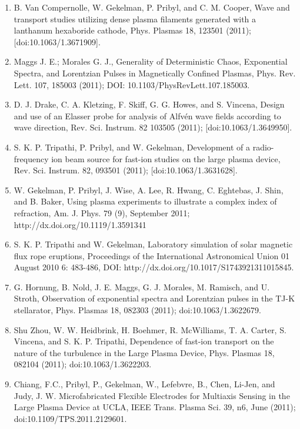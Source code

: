 \documentclass[11pt]{article}
\begin{document}
\begin{enumerate}
\item   B. Van Compernolle, W. Gekelman, P. Pribyl, and C. M. Cooper, Wave and transport studies utilizing dense plasma filaments generated with a lanthanum hexaboride cathode, Phys. Plasmas 18, 123501 (2011); [doi:10.1063/1.3671909].

\item  Maggs J. E.; Morales G. J., Generality of Deterministic Chaos, Exponential Spectra, and Lorentzian Pulses in Magnetically Confined Plasmas, Phys. Rev. Lett. 107, 185003 (2011); DOI: 10.1103/PhysRevLett.107.185003.

\item  D. J. Drake, C. A. Kletzing, F. Skiff, G. G. Howes, and S. Vincena, Design and use of an Elasser probe for analysis of Alfv\'{e}n wave fields according to wave direction, Rev. Sci. Instrum. 82 103505 (2011); [doi:10.1063/1.3649950].

\item   S. K. P. Tripathi, P. Pribyl, and W. Gekelman, Development of a radio-frequency ion beam source for fast-ion studies on the large plasma device, Rev. Sci. Instrum. 82, 093501 (2011); [doi:10.1063/1.3631628].

\item   W. Gekelman, P. Pribyl, J. Wise, A. Lee, R. Hwang, C. Eghtebas, J. Shin, and B. Baker, Using plasma experiments to illustrate a complex index of refraction, Am. J. Phys. 79 (9), September 2011; http://dx.doi.org/10.1119/1.3591341

\item   S. K. P. Tripathi and W. Gekelman, Laboratory simulation of solar magnetic flux rope eruptions, Proceedings of the International Astronomical Union 01 August 2010 6: 483-486, DOI: http://dx.doi.org/10.1017/S1743921311015845.

\item   G. Hornung, B. Nold, J. E. Maggs, G. J. Morales, M. Ramisch, and U. Stroth, Observation of exponential spectra and Lorentzian pulses in the TJ-K stellarator, Phys. Plasmas 18, 082303 (2011); doi:10.1063/1.3622679.

\item  Shu Zhou, W. W. Heidbrink, H. Boehmer, R. McWilliams, T. A. Carter, S. Vincena, and S. K. P. Tripathi, Dependence of fast-ion transport on the nature of the turbulence in the Large Plasma Device, Phys. Plasmas 18, 082104 (2011); doi:10.1063/1.3622203.

\item  Chiang, F.C., Pribyl, P., Gekelman, W., Lefebvre, B., Chen, Li-Jen, and Judy, J. W. Microfabricated Flexible Electrodes for Multiaxis Sensing in the Large Plasma Device at UCLA, IEEE Trans. Plasma Sci. 39, n6, June (2011); doi:10.1109/TPS.2011.2129601.


\end{enumerate}
\end{document}
